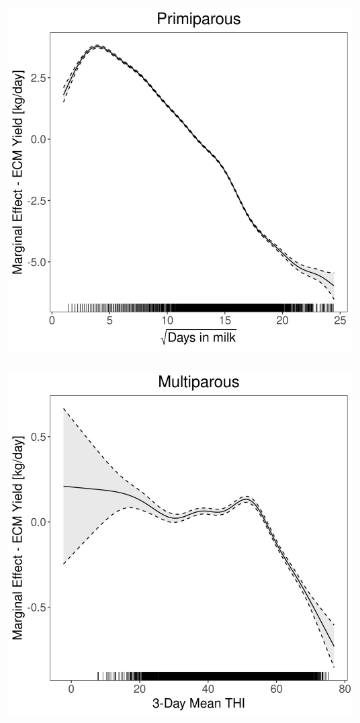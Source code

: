 \begin{figure}[H]
\begin{subfigure}[b]{0.45\textwidth}
    \end{subfigure}
    \hspace{0.05\textwidth} %
    \begin{subfigure}[b]{0.45\textwidth}
        \centering
        \includegraphics[width=\textwidth]{thesis/figures/models/ecm/after2010/ob_ecm_after2010/ob_ecm_after2010_marginal_dim_milk_primi.png}
    \end{subfigure}
    \begin{subfigure}[b]{0.45\textwidth}
        \centering
        \includegraphics[width=\textwidth]{thesis/figures/models/ecm/after2010/ob_ecm_after2010/ob_ecm_after2010_marginal_thi_milk_multi.png}

\end{subfigure}
\end{figure}
